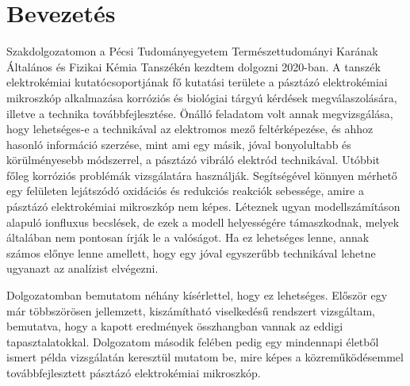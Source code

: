 \chapter{Bevezetés}
\pagestyle{headings}

Szakdolgozatomon a Pécsi Tudományegyetem Természettudományi Karának Általános és Fizikai Kémia Tanszékén kezdtem dolgozni 2020-ban. A tanszék elektrokémiai kutatócsoportjának fő kutatási területe a pásztázó elektrokémiai mikroszkóp alkalmazása korróziós és biológiai tárgyú kérdések megválaszolására, illetve a technika továbbfejlesztése. Önálló feladatom volt annak megvizsgálása, hogy lehetséges-e a technikával az elektromos mező feltérképezése, és ahhoz hasonló információ szerzése, mint ami egy másik, jóval bonyolultabb és körülményesebb módszerrel, a pásztázó vibráló elektród technikával. Utóbbit főleg korróziós problémák vizsgálatára használják. Segítségével könnyen mérhető egy felületen lejátszódó oxidációs és redukciós reakciók sebessége, amire a pásztázó elektrokémiai mikroszkóp nem képes. Léteznek ugyan modellszámításon alapuló ionfluxus becslések, de ezek a modell helyességére támaszkodnak, melyek általában nem pontosan írják le a valóságot. Ha ez lehetséges lenne, annak számos előnye lenne amellett, hogy egy jóval egyszerűbb technikával lehetne ugyanazt az analízist elvégezni.

Dolgozatomban bemutatom néhány kísérlettel, hogy ez lehetséges. Először egy már többszörösen jellemzett, kiszámítható viselkedésű rendszert vizsgáltam, bemutatva, hogy a kapott eredmények összhangban vannak az eddigi tapasztalatokkal. Dolgozatom második felében pedig egy mindennapi életből ismert példa vizsgálatán keresztül mutatom be, mire képes a közreműködésemmel továbbfejlesztett pásztázó elektrokémiai mikroszkóp.

